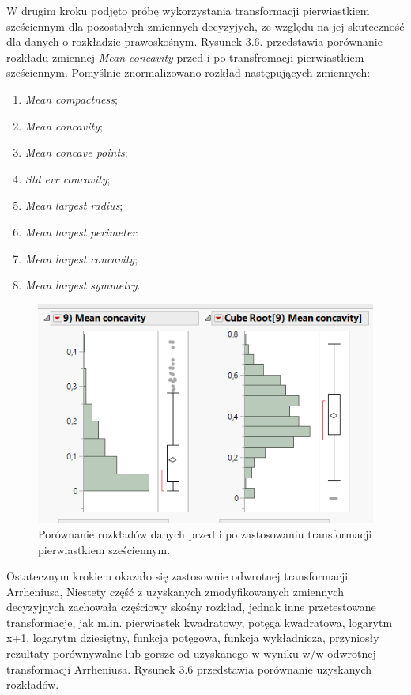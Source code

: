 	\newpage

	W drugim kroku podjęto próbę wykorzystania transformacji pierwiastkiem sześciennym dla pozostałych zmiennych decyzyjych, ze względu na jej skuteczność dla danych o rozkładzie prawoskośnym. Rysunek 3.6. przedstawia porównanie rozkładu zmiennej \textit{Mean concavity} przed i po transfromacji pierwiastkiem sześciennym. Pomyślnie znormalizowano rozkład następujących zmiennych:
	
	\begin{enumerate}
		\item \textit{Mean compactness};
		\item \textit{Mean concavity};
		\item \textit{Mean concave points};
		\item \textit{Std err concavity};
		\item \textit{Mean largest radius};
		\item \textit{Mean largest perimeter};
		\item \textit{Mean largest concavity};
		\item \textit{Mean largest symmetry}.
	\end{enumerate} 

\begin{figure}[!ht]
	\centering
	\includegraphics[width=0.7\linewidth]{Rysunki/Rozdzial3/cube_root}
	\caption{Porównanie rozkładów danych przed i po zastosowaniu transformacji pierwiastkiem sześciennym.}
	\label{fig:cuberoot}
\end{figure}

	Ostatecznym krokiem okazało się zastosownie odwrotnej transformacji Arrheniusa, Niestety część z uzyskanych zmodyfikowanych zmiennych decyzyjnych zachowała częściowy skośny rozkład, jednak inne przetestowane transformacje, jak m.in. pierwiastek kwadratowy, potęga kwadratowa, logarytm x+1, logarytm dziesiętny, funkcja potęgowa, funkcja wykładnicza, przyniosły rezultaty porównywalne lub gorsze od uzyskanego w wyniku w/w odwrotnej transformacji Arrheniusa. Rysunek 3.6 przedstawia porównanie uzyskanych rozkładów.
	
